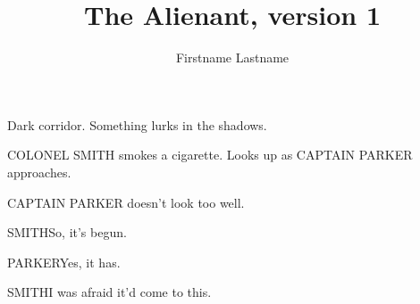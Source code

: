 \documentclass{screenplay}
\title{The Alienant, version 1}
\author{Firstname Lastname}
\begin{document}
\coverpage
\fadein
{}

Dark corridor. Something lurks in the shadows.


COLONEL SMITH smokes a cigarette. Looks up as CAPTAIN PARKER approaches.

CAPTAIN PARKER doesn't look too well.

\begin{dialogue}{SMITH}So, it's begun.\end{dialogue}

\begin{dialogue}{PARKER}Yes, it has.\end{dialogue}

\begin{dialogue}{SMITH}I was afraid it'd come to this.\end{dialogue}

\fadeout
\theend
\end{document}
